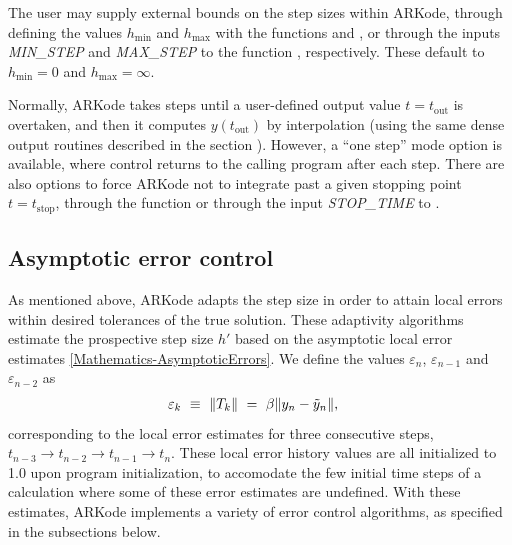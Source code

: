 \documentclass[letterpaper,10pt,english]{sphinxmanual}
\begin{document}
The user may supply external bounds on the step sizes within ARKode,
through defining the values \(h_\text{min}\) and \(h_\text{max}\) with
the functions {\hyperref[c_interface/User_callable:c.ARKodeSetMinStep]{\emph{}}} and
{\hyperref[c_interface/User_callable:c.ARKodeSetMaxStep]{\emph{}}}, or through the inputs \emph{MIN\_STEP} and
\emph{MAX\_STEP} to the function {\hyperref[f_interface/Usage:f/_/FARKSETRIN]{\emph{}}}, respectively.
These default to \(h_\text{min}=0\) and \(h_\text{max}=\infty\).

Normally, ARKode takes steps until a user-defined output value
\(t = t_\text{out}\) is overtaken, and then it computes
\(y(t_\text{out})\) by interpolation (using the same dense output
routines described in the section
{\hyperref[Mathematics:mathematics-predictors-max]{\emph{}}}). However, a ``one step'' mode option
is available, where control returns to the calling program after each
step. There are also options to force ARKode not to integrate past a
given stopping point \(t = t_\text{stop}\), through the function
{\hyperref[c_interface/User_callable:c.ARKodeSetStopTime]{\emph{}}} or through the input \emph{STOP\_TIME} to
{\hyperref[f_interface/Usage:f/_/FARKSETRIN]{\emph{}}}.


\subsection{Asymptotic error control}
\label{Mathematics:asymptotic-error-control}\label{Mathematics:mathematics-adaptivity-errorcontrol}
As mentioned above, ARKode adapts the step size in order to attain
local errors within desired tolerances of the true solution.  These
adaptivity algorithms estimate the prospective step size \(h'\)
based on the asymptotic local error estimates \eqref{Mathematics-AsymptoticErrors}.
We define the values \(\varepsilon_n\), \(\varepsilon_{n-1}\)
and \(\varepsilon_{n-2}\) as
\begin{gather}
\begin{split}\varepsilon_k &\ \equiv \ \|T_k\|
   \ = \ \beta \|y_n - \tilde{y}_n\|,\end{split}\notag
\end{gather}
corresponding to the local error estimates for three consecutive
steps, \(t_{n-3} \to t_{n-2} \to t_{n-1} \to t_n\).  These local
error history values are all initialized to 1.0 upon program
initialization, to accomodate the few initial time steps of a
calculation where some of these error estimates are undefined.  With
these estimates, ARKode implements a variety of error control
algorithms, as specified in the subsections below.
\end{document}
